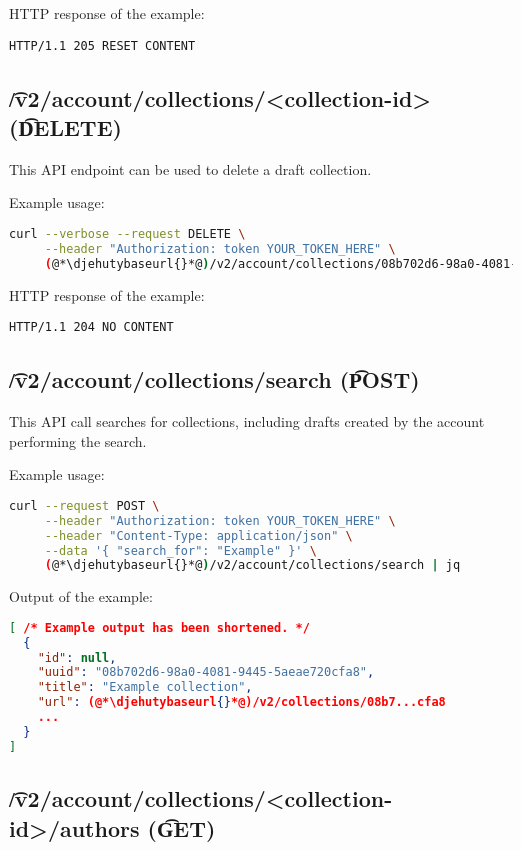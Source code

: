   HTTP response of the example:
\begin{lstlisting}
HTTP/1.1 205 RESET CONTENT
\end{lstlisting}

\subsection{\t{/v2/account/collections/<collection-id>} (\t{DELETE})}

  This API endpoint can be used to delete a draft collection.

  Example usage:
\begin{lstlisting}[language=bash]
curl --verbose --request DELETE \
     --header "Authorization: token YOUR_TOKEN_HERE" \
     (@*\djehutybaseurl{}*@)/v2/account/collections/08b702d6-98a0-4081-9445-5aeae720cfa8
\end{lstlisting}

  HTTP response of the example:
\begin{lstlisting}
HTTP/1.1 204 NO CONTENT
\end{lstlisting}

\subsection{\t{/v2/account/collections/search} (\t{POST})}

  This API call searches for collections, including drafts created
  by the account performing the search.

  Example usage:
\begin{lstlisting}[language=bash]
curl --request POST \
     --header "Authorization: token YOUR_TOKEN_HERE" \
     --header "Content-Type: application/json" \
     --data '{ "search_for": "Example" }' \
     (@*\djehutybaseurl{}*@)/v2/account/collections/search | jq
\end{lstlisting}

  Output of the example:
\begin{lstlisting}[language=JSON]
[ /* Example output has been shortened. */
  {
    "id": null,
    "uuid": "08b702d6-98a0-4081-9445-5aeae720cfa8",
    "title": "Example collection",
    "url": (@*\djehutybaseurl{}*@)/v2/collections/08b7...cfa8
    ...
  }
]
\end{lstlisting}

\subsection{\t{/v2/account/collections/<collection-id>/authors} (\t{GET})}
\label{sec:api-v2-collections-authors}


